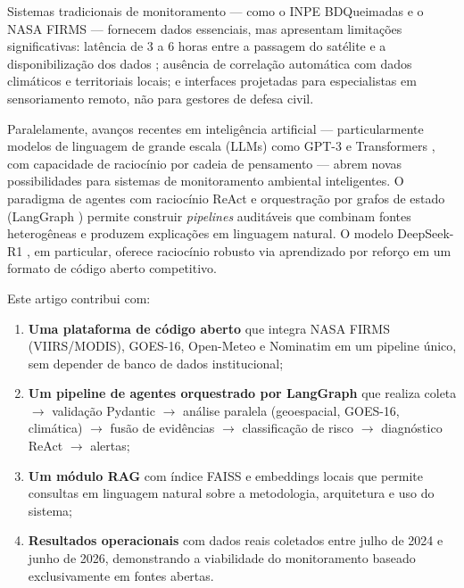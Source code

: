 \documentclass[preprint,times,numbers]{elsarticle}
\begin{document}
Sistemas tradicionais de monitoramento --- como o INPE BDQueimadas e o NASA FIRMS --- fornecem dados essenciais, mas apresentam limitações significativas: latência de 3 a 6 horas entre a passagem do satélite e a disponibilização dos dados \cite{manual:firms2024}; ausência de correlação automática com dados climáticos e territoriais locais; e interfaces projetadas para especialistas em sensoriamento remoto, não para gestores de defesa civil.

Paralelamente, avanços recentes em inteligência artificial --- particularmente modelos de linguagem de grande escala (LLMs) como GPT-3 \cite{article:brown2020} e Transformers \cite{article:vaswani2017}, com capacidade de raciocínio por cadeia de pensamento \cite{article:wei2022} --- abrem novas possibilidades para sistemas de monitoramento ambiental inteligentes. O paradigma de agentes com raciocínio ReAct \cite{article:react2023} e orquestração por grafos de estado (LangGraph \cite{manual:langgraph2024}) permite construir \emph{pipelines} auditáveis que combinam fontes heterogêneas e produzem explicações em linguagem natural. O modelo DeepSeek-R1 \cite{article:deepseek2025}, em particular, oferece raciocínio robusto via aprendizado por reforço em um formato de código aberto competitivo.

Este artigo contribui com:

\begin{enumerate}
    \item \textbf{Uma plataforma de código aberto} que integra NASA FIRMS (VIIRS/MODIS), GOES-16, Open-Meteo e Nominatim em um pipeline único, sem depender de banco de dados institucional;
    \item \textbf{Um pipeline de agentes orquestrado por LangGraph} que realiza coleta $\rightarrow$ validação Pydantic $\rightarrow$ análise paralela (geoespacial, GOES-16, climática) $\rightarrow$ fusão de evidências $\rightarrow$ classificação de risco $\rightarrow$ diagnóstico ReAct $\rightarrow$ alertas;
    \item \textbf{Um módulo RAG} com índice FAISS e embeddings locais que permite consultas em linguagem natural sobre a metodologia, arquitetura e uso do sistema;
    \item \textbf{Resultados operacionais} com dados reais coletados entre julho de 2024 e junho de 2026, demonstrando a viabilidade do monitoramento baseado exclusivamente em fontes abertas.
\end{enumerate}

\end{document}
